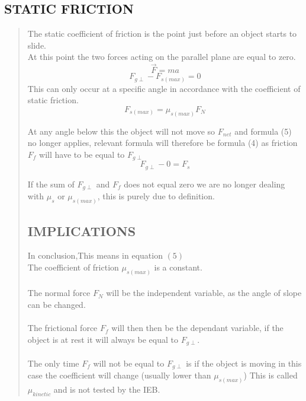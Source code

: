 \documentclass{article}
\begin{document}
    \subsection*{STATIC FRICTION}
    \begin{quote}
        The static coefficient of friction is the point just before an object starts to slide.\\
        At this point the two forces acting on the parallel plane are equal to zero.
     \begin{equation}
         \vec{F} = ma
     \end{equation}
     \begin{equation}
        F_{g\perp} - F_{s(max)} = 0
    \end{equation}        
        This can only occur at a specific angle in accordance with the coefficient of static friction.
        \begin{equation}
           F_{s(max)} = \mu_{s(max)} F_N 
        \end{equation}
        
        At any angle below this the object will not move so $F_{net} $ and formula (5) no longer applies, relevant formula will therefore be formula (4) as friction $F_{f}$ will have to be equal to  $F_{g\perp}$ \\
        $$F_{g\perp} - 0 =  F_{s}$$
        
        If the sum of $F_{g \perp}$ and $F_f$ does not equal zero we are no longer dealing with $\mu_{s}$ or $\mu_{s(max)}$, this is purely due to definition.\\
        
    \subsection*{IMPLICATIONS}
        In conclusion,This means in equation $(5)$\\ 
        The coefficient of friction $\mu_{s(max)}$ is a constant. \\
        \\
        The normal force $F_N$ will be the independent variable, as the angle of slope can be changed.   \\
        \\
        The frictional force $F_f$  will then then be the dependant variable, if the object is at rest it will always be equal to $F_{g \perp}$. \\
        \\
        The only time $F_f$ will not be equal to $F_{g \perp}$ is if the object is moving in this case the coefficient will change (usually lower than $\mu_{s(max)}$) This is called $\mu_{kinetic}$ and is not tested by the IEB.
    
   
          

        
        
    \end{quote}
    
\end{document}
